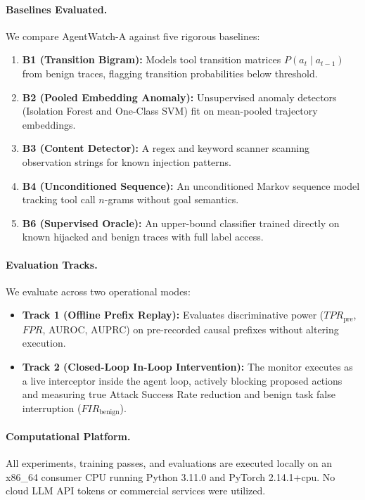 \documentclass[11pt,a4paper]{article}
\begin{document}
\paragraph{Baselines Evaluated.}
We compare AgentWatch-A against five rigorous baselines:
\begin{enumerate}
    \item \textbf{B1 (Transition Bigram):} Models tool transition matrices $P(a_t \mid a_{t-1})$ from benign traces, flagging transition probabilities below threshold.
    \item \textbf{B2 (Pooled Embedding Anomaly):} Unsupervised anomaly detectors (Isolation Forest and One-Class SVM) fit on mean-pooled trajectory embeddings.
    \item \textbf{B3 (Content Detector):} A regex and keyword scanner scanning observation strings for known injection patterns.
    \item \textbf{B4 (Unconditioned Sequence):} An unconditioned Markov sequence model tracking tool call $n$-grams without goal semantics.
    \item \textbf{B6 (Supervised Oracle):} An upper-bound classifier trained directly on known hijacked and benign traces with full label access.
\end{enumerate}

\paragraph{Evaluation Tracks.}
We evaluate across two operational modes:
\begin{itemize}
    \item \textbf{Track 1 (Offline Prefix Replay):} Evaluates discriminative power ($TPR_{\text{pre}}$, $FPR$, AUROC, AUPRC) on pre-recorded causal prefixes without altering execution.
    \item \textbf{Track 2 (Closed-Loop In-Loop Intervention):} The monitor executes as a live interceptor inside the agent loop, actively blocking proposed actions and measuring true Attack Success Rate reduction and benign task false interruption ($FIR_{\text{benign}}$).
\end{itemize}

\paragraph{Computational Platform.}
All experiments, training passes, and evaluations are executed locally on an x86\_64 consumer CPU running Python 3.11.0 and PyTorch 2.14.1+cpu. No cloud LLM API tokens or commercial services were utilized.
\end{document}
